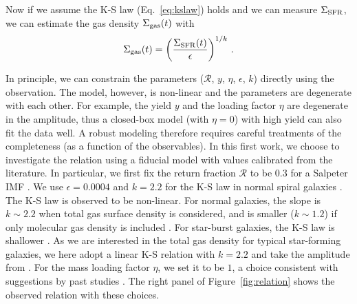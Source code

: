 \documentclass[12pt, appendixfloats, numberedappendix]{emulateapj}
\begin{document}
Now if we assume the K-S law (Eq.~\ref{eq:kslaw}) holds and we can measure $\Sigma_{\rm SFR}$,
we can estimate the gas density $\Sigma_{\rm gas}(t)$ with 
\begin{equation}
\Sigma_{\rm gas}(t) = \left( \frac{\Sigma_{\rm SFR}(t)}{\epsilon} \right)^{1/k}\,\mathrm{.}
\end{equation}





In principle, we can constrain the parameters ($\mathcal{R}$, $y$, $\eta$, $\epsilon$, $k$) directly using the observation. 
The model, however, is non-linear and the parameters are degenerate with each other. For example, the yield $y$ and 
the loading factor $\eta$ are degenerate in the amplitude, thus a closed-box model (with $\eta=0$) with high yield 
can also fit the data well.
A robust modeling therefore requires careful treatments of the completeness (as a function of the observables).
In this first work, we choose to investigate the relation using a fiducial model with values calibrated from the literature.
In particular, we first fix the return fraction $\mathcal{R}$ to be $0.3$ for a Salpeter IMF \citep[\eg][]{tinsley80a, madau14a}.
We use $\epsilon=0.0004$ and $k=2.2$ for the K-S law in normal spiral galaxies \citep[\eg][]{misiriotis06a, bigiel08a}.
The K-S law is observed to be non-linear. For normal galaxies, the slope is $k\sim2.2$ when total gas surface density is considered, 
and is smaller ($k\sim1.2$) if only molecular gas density is included \citep[\eg][]{wong02a, boissier03a, luna06a}.  
For star-burst galaxies, the K-S law is shallower \citep[\eg][]{bigiel08a}.  
As we are interested in the total gas density for typical star-forming galaxies, we here adopt a linear K-S relation with $k=2.2$ and take the amplitude from \citet{bigiel08a}. 
For the mass loading factor $\eta$, we set it to be $1$, a choice consistent with suggestions by past studies \citep[\eg][]{martin99a, veilleux05a, schaye10a, heckman15a}.
The right panel of Figure~\ref{fig:relation} shows the observed relation with these choices. 
\end{document}
